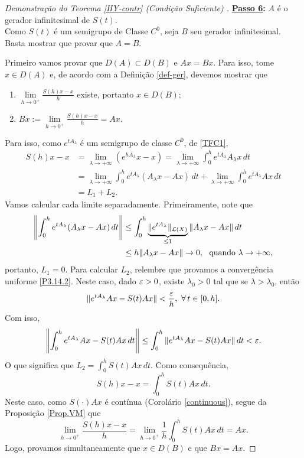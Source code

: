 \begin{proof}[Demonstração do Teorema {\ref{HY-contr}} (Condição Suficiente) ]
\noindent\textbf{\underline{Passo 6}:} $A$ é o gerador infinitesimal de $S(t)$.
\\

Como $S(t)$ é um semigrupo de Classe $C^0$, seja $B$ seu gerador infinitesimal.
Basta mostrar que provar que $A=B$. 

Primeiro vamos provar que $D(A)\subset D(B)$ e $Ax=Bx$. Para 
isso, tome $x\in D(A)$ e, de acordo com a Definição 
\ref{def-ger}, devemos mostrar que 
\begin{enumerate}
\item $\lim\limits_{h \to 0^+}\frac{S(h)x-x}{h}$ existe, portanto $x\in D(B)$;
\item $Bx:=\lim\limits_{h \to 0^+}\frac{S(h)x-x}{h}=Ax$.
\end{enumerate}
Para isso, como $e^{tA_\lambda}$ é um semigrupo de classe $C^0$, de \eqref{TFC1},
\begin{align*}
S(h)x-x& =\lim\limits_{\lambda \to +\infty} \left(e^{hA_\lambda}x-x\right)
=\lim\limits_{\lambda \to +\infty} \int_0^h e^{tA_\lambda}A_\lambda x\,dt\\
&= \lim\limits_{\lambda \to +\infty} \int_0^h e^{tA_\lambda}(A_\lambda x-Ax)\,dt
+\lim\limits_{\lambda \to +\infty} \int_0^h e^{tA_\lambda}A x\,dt\\
& = L_1+L_2.
\end{align*}
Vamos calcular cada limite separadamente. Primeiramente, note que
\begin{align*}
\left\|\int_0^h e^{tA_\lambda}(A_\lambda x-Ax)\,dt \right\|
& \leq \int_0^h \underbrace{\|e^{tA_\lambda}\|_{\mathcal{L}(X)} }_{\leq 1}\|A_\lambda x-Ax\|\,dt\\
& \leq h\|A_\lambda x-Ax\|\to 0, \ \text{ quando } \lambda \to +\infty,
\end{align*}
portanto, $L_1=0$. Para calcular $L_2$, relembre que provamos a convergência 
uniforme \eqref{P3.14.2}. Neste caso, dado $\varepsilon>0$, existe $\lambda_0>0$  tal que
se $\lambda>\lambda_0$, então
\begin{equation*}
\|e^{tA_\lambda}Ax-S(t)Ax\|< \frac{\varepsilon}{h}, \ \forall\, t\in [0,h].
\end{equation*}
Com isso, 
\begin{equation*}
\left\|\int_0^h e^{tA_\lambda}A x-S(t)Ax\,dt\right\|
\leq \int_0^h \|e^{tA_\lambda}A x-S(t)Ax\|\,dt < \varepsilon.
\end{equation*}
O que significa que $L_2=\int_0^h S(t)Ax\,dt$. Como consequência,
\begin{equation*}
S(h)x-x=\int_0^h S(t)Ax\,dt.
\end{equation*}
Neste caso, como $S(\cdot)Ax$ é contínua (Corolário \ref{continuous}),
segue da Proposição \ref{Prop.VM}  que
\begin{equation*}
\lim\limits_{h\to 0^+}\frac{S(h)x-x}{h}
=\lim\limits_{h\to 0^+}\frac{1}{h}\int_0^h S(t)Ax\,dt=Ax.
\end{equation*}
Logo, provamos simultaneamente  que $x\in D(B)$ e que $Bx=Ax$.


\end{proof}
